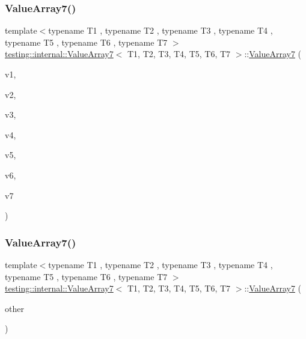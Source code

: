 \subsubsection{\texorpdfstring{ValueArray7()}{ValueArray7()}\hspace{0.1cm}{\footnotesize\ttfamily [1/2]}}
{\footnotesize\ttfamily template$<$typename T1 , typename T2 , typename T3 , typename T4 , typename T5 , typename T6 , typename T7 $>$ \\
\mbox{\hyperlink{classtesting_1_1internal_1_1ValueArray7}{testing\+::internal\+::\+Value\+Array7}}$<$ T1, T2, T3, T4, T5, T6, T7 $>$\+::\mbox{\hyperlink{classtesting_1_1internal_1_1ValueArray7}{Value\+Array7}} (\begin{DoxyParamCaption}\item[{T1}]{v1,  }\item[{T2}]{v2,  }\item[{T3}]{v3,  }\item[{T4}]{v4,  }\item[{T5}]{v5,  }\item[{T6}]{v6,  }\item[{T7}]{v7 }\end{DoxyParamCaption})\hspace{0.3cm}{\ttfamily [inline]}}

\mbox{\label{classtesting_1_1internal_1_1ValueArray7_ab4be0da0f772c885c6fe681ea486ece4}} 
\subsubsection{\texorpdfstring{ValueArray7()}{ValueArray7()}\hspace{0.1cm}{\footnotesize\ttfamily [2/2]}}
{\footnotesize\ttfamily template$<$typename T1 , typename T2 , typename T3 , typename T4 , typename T5 , typename T6 , typename T7 $>$ \\
\mbox{\hyperlink{classtesting_1_1internal_1_1ValueArray7}{testing\+::internal\+::\+Value\+Array7}}$<$ T1, T2, T3, T4, T5, T6, T7 $>$\+::\mbox{\hyperlink{classtesting_1_1internal_1_1ValueArray7}{Value\+Array7}} (\begin{DoxyParamCaption}\item[{const \mbox{\hyperlink{classtesting_1_1internal_1_1ValueArray7}{Value\+Array7}}$<$ T1, T2, T3, T4, T5, T6, T7 $>$ \&}]{other }\end{DoxyParamCaption})\hspace{0.3cm}{\ttfamily [inline]}}



